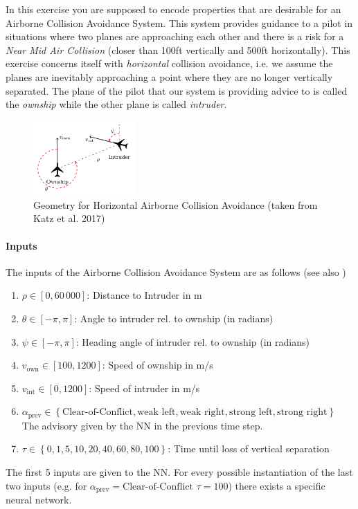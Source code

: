\documentclass[11pt,fleqn]{article}
\begin{document}
In this exercise you are supposed to encode properties that are desirable for an
Airborne Collision Avoidance System.
This system provides guidance to a pilot in situations where two planes are approaching each other and there is a risk for a \emph{Near Mid Air Collision} (closer than 100ft vertically and 500ft horizontally).
This exercise concerns itself with \emph{horizontal} collision avoidance, i.e. we assume the planes 
are inevitably approaching a point where they are no longer vertically separated.
The plane of the pilot that our system is providing advice to is called the \emph{ownship} while the other plane is called \emph{intruder}.


\begin{figure}
    \centering
    \includegraphics[width=0.35\textwidth]{figures/acas.png}
    \caption{Geometry for Horizontal Airborne Collision Avoidance (taken from Katz et al. 2017)}
    \label{fig:acas}
\end{figure}

\paragraph*{Inputs}
The inputs of the Airborne Collision Avoidance System are as follows (see also )
\begin{enumerate}
    \item $\rho \in \left[0,60\,000\right]$: Distance to Intruder in m
    \item $\theta \in \left[-\pi,\pi\right]$: Angle to intruder rel. to ownship (in radians)
    \item $\psi \in \left[-\pi,\pi\right]$: Heading angle of intruder rel. to ownship (in radians)
    \item $v_{\text{own}} \in \left[100,1200\right]$: Speed of ownship in m/s
    \item $v_{\text{int}} \in \left[0,1200\right]$: Speed of intruder in m/s
    \item $\alpha_{\text{prev}}\in\left\{\text{Clear-of-Conflict}, \text{weak left}, \text{weak right}, \text{strong left}, \text{strong right}\right\}$\\
    The advisory given by the NN in the previous time step.
    \item $\tau \in \left\{0, 1, 5, 10, 20, 40, 60, 80, 100\right\}$: Time until loss of vertical separation
\end{enumerate}
The first 5 inputs are given to the NN.
For every possible instantiation of the last two inputs (e.g. for $\alpha_{\text{prev}}=\text{Clear-of-Conflict}$ $\tau=100$) there exists a specific neural network.
\end{document}
